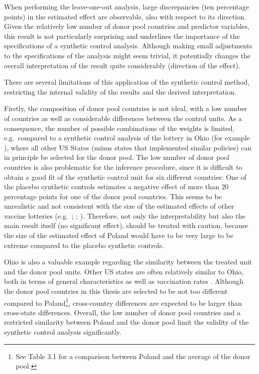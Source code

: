 \documentclass{scrbook}
\begin{document}
When performing the leave-one-out analysis, large discrepancies (ten
percentage points) in the estimated effect are observable, also with
respect to its direction. Given the relatively low number of donor pool
countries and predictor variables, this result is not particularly
surprising and underlines the importance of the specifications of a
synthetic control analysis. Although making small adjustments to the
specifications of the analysis might seem trivial, it potentially
changes the overall interpretation of the result quite considerably
(direction of the effect).

There are several limitations of this application of the synthetic
control method, restricting the internal validity of the results and the
derived interpretation.

Firstly, the composition of donor pool countries is not ideal, with a
low number of countries as well as considerable differences between the
control units. As a consequence, the number of possible combinations of
the weights is limited, e.g.~compared to a synthetic control analysis of
the lottery in Ohio (for example \textcite{barber_conditional_2022}),
where all other US States (minus states that implemented similar
policies) can in principle be selected for the donor pool. The low
number of donor pool countries is also problematic for the inference
procedure, since it is difficult to obtain a good fit of the synthetic
control unit for six different countries: One of the placebo synthetic
controls estimates a negative effect of more than 20 percentage points
for one of the donor pool countries. This seems to be unrealistic and
not consistent with the size of the estimated effects of other vaccine
lotteries (e.g.~\cite{robertson_are_2021};
\cite{acharya_implementation_2021}; \cite{fuller_assessing_2022}).
Therefore, not only the interpretability but also the main result itself
(no significant effect), should be treated with caution, because the
size of the estimated effect of Poland would have to be very large to be
extreme compared to the placebo synthetic controls.

Ohio is also a valuable example regarding the similarity between the
treated unit and the donor pool units. Other US states are often
relatively similar to Ohio, both in terms of general characteristics as
well as vaccination rates \parencite{mathieu_global_2021}. Although the
donor pool countries in this thesis are selected to be not too different
compared to
Poland\footnote{See Table 3.1 for a comparison between Poland and the average of the donor pool.},
cross-country differences are expected to be larger than cross-state
differences. Overall, the low number of donor pool countries and a
restricted similarity between Poland and the donor pool limit the
validity of the synthetic control analysis significantly.
\end{document}

